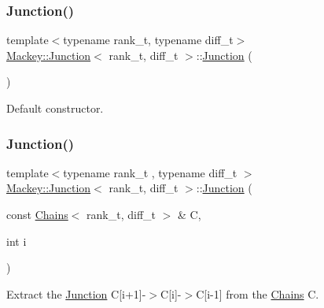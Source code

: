 \subsubsection{\texorpdfstring{Junction()}{Junction()}\hspace{0.1cm}{\footnotesize\ttfamily [1/3]}}
{\footnotesize\ttfamily template$<$typename rank\+\_\+t, typename diff\+\_\+t$>$ \\
\hyperlink{classMackey_1_1Junction}{Mackey\+::\+Junction}$<$ rank\+\_\+t, diff\+\_\+t $>$\+::\hyperlink{classMackey_1_1Junction}{Junction} (\begin{DoxyParamCaption}{ }\end{DoxyParamCaption})\hspace{0.3cm}{\ttfamily [inline]}}



Default constructor. 

\mbox{\label{classMackey_1_1Junction_ae6e36887e5bd3be8fe6175a501c749db}} 
\subsubsection{\texorpdfstring{Junction()}{Junction()}\hspace{0.1cm}{\footnotesize\ttfamily [2/3]}}
{\footnotesize\ttfamily template$<$typename rank\+\_\+t , typename diff\+\_\+t $>$ \\
\hyperlink{classMackey_1_1Junction}{Mackey\+::\+Junction}$<$ rank\+\_\+t, diff\+\_\+t $>$\+::\hyperlink{classMackey_1_1Junction}{Junction} (\begin{DoxyParamCaption}\item[{const \hyperlink{classMackey_1_1Chains}{Chains}$<$ rank\+\_\+t, diff\+\_\+t $>$ \&}]{C,  }\item[{int}]{i }\end{DoxyParamCaption})}



Extract the \hyperlink{classMackey_1_1Junction}{Junction} C\mbox{[}i+1\mbox{]}-\/$>$C\mbox{[}i\mbox{]}-\/$>$C\mbox{[}i-\/1\mbox{]} from the \hyperlink{classMackey_1_1Chains}{Chains} C. 

\mbox{\label{classMackey_1_1Junction_a62c85d26100ca5e561b3c9edf32b473f}} 
